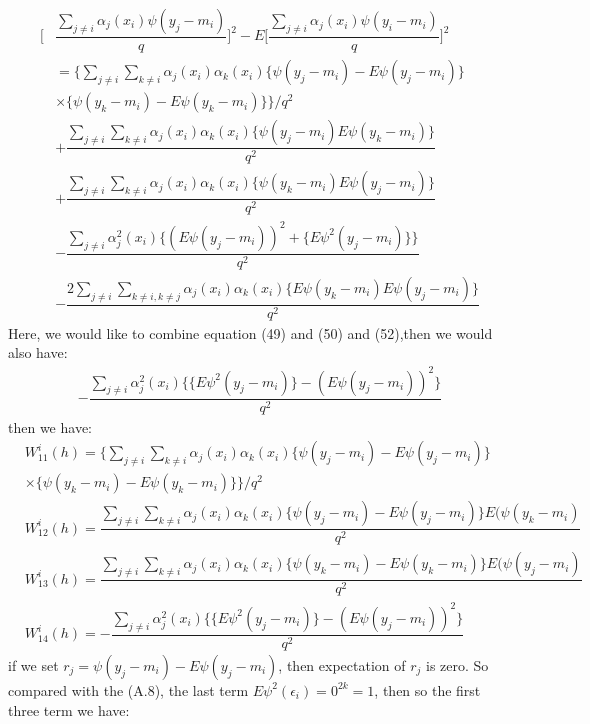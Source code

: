 \documentclass[12pt]{amsart}
\begin{document}
\begin{align}
\bigg[&\dfrac{\sum_{j\neq i}\alpha_{j}(x_{i})\psi(y_{j}-m_{i})}{q}\bigg]^{2}-E\bigg[\dfrac{\sum_{j\neq i}\alpha_{j}(x_{i})\psi(y_{i}-m_{i})}{q}\bigg]^{2}\nonumber\\
&=\bigg \{\sum_{j\neq i} \sum_{k\neq i}\alpha_{j}(x_{i})\alpha_{k}(x_{i})\{\psi(y_{j}-m_{i})-E\psi(y_{j}-m_{i})\}\nonumber\\
&\times\{\psi(y_{k}-m_{i})-E\psi(y_{k}-m_{i})\}\bigg \}\bigg/q^{2}\nonumber\\
&+\dfrac{\sum_{j\neq i} \sum_{k\neq i}\alpha_{j}(x_{i})\alpha_{k}(x_{i})\{\psi(y_{j}-m_{i})E\psi(y_{k}-m_{i})\}}{q^2}\nonumber\\
&+\dfrac{\sum_{j\neq i} \sum_{k\neq i}\alpha_{j}(x_{i})\alpha_{k}(x_{i})\{\psi(y_{k}-m_{i})E\psi(y_{j}-m_{i})\}}{q^2}\nonumber\\
&-\dfrac{\sum_{j\neq i} \alpha^{2}_{j}(x_{i})\{(E\psi(y_{j}-m_{i}))^{2}+\{E\psi^{2}(y_{j}-m_{i})\}\}}{q^2}\nonumber\\
&-\dfrac{2\sum_{j\neq i} \sum_{k\neq i,k\neq j}\alpha_{j}(x_{i})\alpha_{k}(x_{i})\{E\psi(y_{k}-m_{i})E\psi(y_{j}-m_{i})\}}{q^2}
\end{align}
Here, we would like to combine equation (49) and (50) and (52),then we would also have:
\begin{align}
-\dfrac{\sum_{j\neq i} \alpha^{2}_{j}(x_{i})\{\{E\psi^{2}(y_{j}-m_{i})\}-(E\psi(y_{j}-m_{i}))^{2}\}}{q^2}\nonumber
\end{align}
then we have:
\begin{align}
&W^{i}_{11}(h)=\bigg \{\sum_{j\neq i} \sum_{k\neq i}\alpha_{j}(x_{i})\alpha_{k}(x_{i})\{\psi(y_{j}-m_{i})-E\psi(y_{j}-m_{i})\}\nonumber\\
&\times\{\psi(y_{k}-m_{i})-E\psi(y_{k}-m_{i})\}\bigg \}\bigg/q^{2}\nonumber\\
&W^{i}_{12}(h)=\dfrac{\sum_{j\neq i} \sum_{k\neq i}\alpha_{j}(x_{i})\alpha_{k}(x_{i})\{\psi(y_{j}-m_{i})-E\psi(y_{j}-m_{i})\}E(\psi(y_{k}-m_{i})}{q^2}\nonumber\\
&W^{i}_{13}(h)=\dfrac{\sum_{j\neq i} \sum_{k\neq i}\alpha_{j}(x_{i})\alpha_{k}(x_{i})\{\psi(y_{k}-m_{i})-E\psi(y_{k}-m_{i})\}E(\psi(y_{j}-m_{i})}{q^2}\nonumber\\
&W^{i}_{14}(h)=-\dfrac{\sum_{j\neq i} \alpha^{2}_{j}(x_{i})\{\{E\psi^{2}(y_{j}-m_{i})\}-(E\psi(y_{j}-m_{i}))^{2}\}}{q^2}
\end{align}
if we set $r_{j}=\psi(y_{j}-m_{i})-E\psi(y_{j}-m_{i})$, then expectation of $r_{j}$ is zero. So compared with the (A.8), the last term $E\psi^{2}(\epsilon_{i})=0^{2k}=1$, then so the first three term we have:
\end{document}
